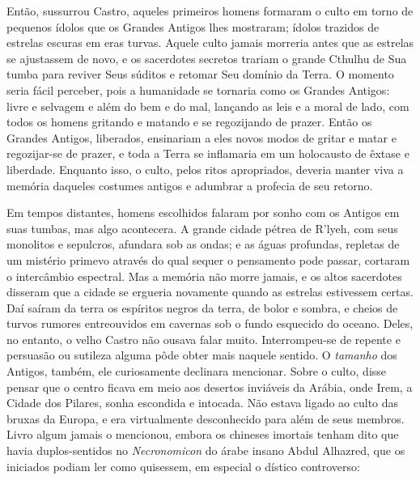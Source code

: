 Então, sussurrou Castro, aqueles primeiros homens formaram o culto em
torno de pequenos ídolos que os Grandes Antigos lhes mostraram; ídolos
trazidos de estrelas escuras em eras turvas. Aquele culto jamais
morreria antes que as estrelas se ajustassem de novo, e os sacerdotes
secretos trariam o grande Cthulhu de Sua tumba para reviver Seus súditos
e retomar Seu domínio da Terra. O momento seria fácil perceber, pois a
humanidade se tornaria como os Grandes Antigos: livre e selvagem e além
do bem e do mal, lançando as leis e a moral de lado, com todos os homens
gritando e matando e se regozijando de prazer. Então os Grandes Antigos,
liberados, ensinariam a eles novos modos de gritar e matar e
regozijar-se de prazer, e toda a Terra se inflamaria em um holocausto de
êxtase e liberdade. Enquanto isso, o culto, pelos ritos apropriados,
deveria manter viva a memória daqueles costumes antigos e adumbrar a
profecia de seu retorno.

Em tempos distantes, homens escolhidos falaram por sonho com os Antigos
em suas tumbas, mas algo acontecera. A grande cidade pétrea de R'lyeh,
com seus monolitos e sepulcros, afundara sob as ondas; e as águas
profundas, repletas de um mistério primevo através do qual sequer o
pensamento pode passar, cortaram o intercâmbio espectral. Mas a memória
não morre jamais, e os altos sacerdotes disseram que a cidade se
ergueria novamente quando as estrelas estivessem certas. Daí saíram da
terra os espíritos negros da terra, de bolor e sombra, e cheios de
turvos rumores entreouvidos em cavernas sob o fundo esquecido do oceano.
Deles, no entanto, o velho Castro não ousava falar muito. Interrompeu-se
de repente e persuasão ou sutileza alguma pôde obter mais naquele
sentido. O \emph{tamanho} dos Antigos, também, ele curiosamente
declinara mencionar. Sobre o culto, disse pensar que o centro ficava em
meio aos desertos inviáveis da Arábia, onde Irem, a Cidade dos
Pilares, sonha escondida e
intocada. Não estava ligado ao culto das bruxas da Europa, e era
virtualmente desconhecido para além de seus membros. Livro algum jamais
o mencionou, embora os chineses imortais tenham dito que havia
duplos-sentidos no \emph{Necronomicon} do árabe insano Abdul Alhazred, que os iniciados podiam ler
como quisessem, em especial o dístico controverso:

